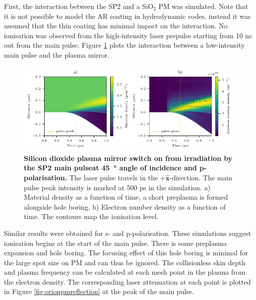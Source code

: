 First, the interaction between the SP2 and a SiO$_2$ PM was simulated. Note that it is not possible to model the AR coating in hydrodynamic codes, instead it was assumed that the thin coating has minimal impact on the interaction. No ionisation was observed from the high-intensity laser prepulse starting from 10 ns out from the main pulse. Figure \ref{fig:orionpmirradiation} plots the interaction between a low-intensity main pulse and the plasma mirror. 
\begin{figure}
	\centering
	\includegraphics{figures/orion/orion_PM_irradiation}
	\caption[Silicon dioxide plasma mirror switch on from irradiation by the SP2 main pulse.]{\textbf{Silicon dioxide plasma mirror switch on from irradiation by the SP2 main pulseat \qty{45}{\degree} angle of incidence and p-polarisation.} The laser pulse travels in the $+\mathbf{\hat{x}}$-direction. The main pulse peak intensity is marked at 500 ps in the simulation. a) Material density as a function of time, a short preplasma is formed alongside hole boring. b) Electron number density as a function of time. The contours map the ionisation level.}
	\label{fig:orionpmirradiation}
\end{figure}
Similar results were obtained for s- and p-polarisation. These simulations suggest ionisation begins at the start of the main pulse. There is some preplasma expansion and hole boring. The focusing effect of this hole boring is minimal for the large spot size on PM and can thus be ignored. The collisionless skin depth and plasma frequency can be calculated at each mesh point in the plasma from the electron density. The corresponding laser attenuation at each point is plotted in Figure \ref{fig:orionpmreflection} at the peak of the main pulse.

